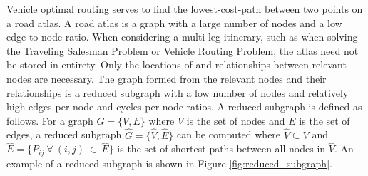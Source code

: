 \documentclass[11pt]{article}
\begin{document}
\begin{multicols}{2}
Vehicle optimal routing serves to find the lowest-cost-path between two points on a road atlas. A road atlas is a graph with a large number of nodes and a low edge-to-node ratio. When considering a multi-leg itinerary, such as when solving the Traveling Salesman Problem or Vehicle Routing Problem, the atlas need not be stored in entirety. Only the locations of and relationships between relevant nodes are necessary. The graph formed from the relevant nodes and their relationships is a reduced subgraph with a low number of nodes and relatively high edges-per-node and cycles-per-node ratios. A reduced subgraph is defined as follows. For a graph $G = \{V, E\}$ where $V$ is the set of nodes and $E$ is the set of edges, a reduced subgraph $\hat{G} = \{\hat{V}, \hat{E}\}$ can be computed where $\hat{V} \subseteq V$ and $\hat{E} = \{P_{ij}\ \forall\ (i, j)\ \in\ \hat{E}\}$ is the set of shortest-paths between all nodes in $\hat{V}$. An example of a reduced subgraph is shown in Figure \ref{fig:reduced_subgraph}.


\end{multicols}
\end{document}
